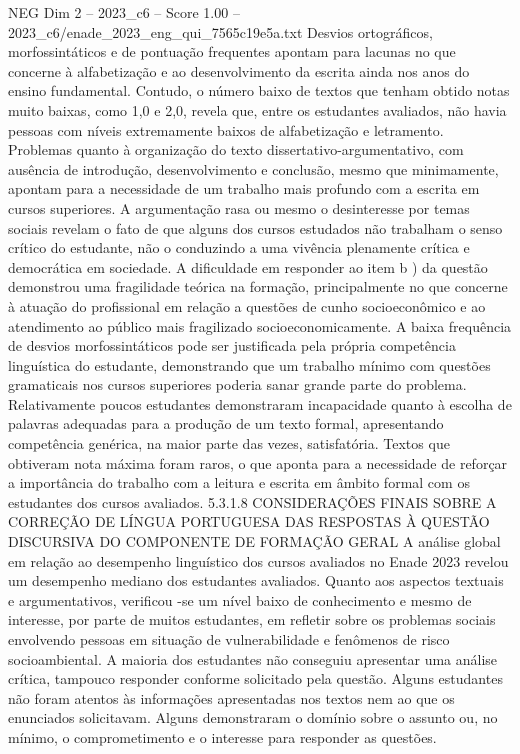\begin{textsample}{NEG Dim 2 – 2023\_c6 – Score 1.00 – 2023\_c6/enade\_2023\_eng\_qui\_7565c19e5a.txt}
Desvios ortográficos, morfossintáticos e de pontuação frequentes apontam para lacunas no que concerne à alfabetização e ao desenvolvimento da escrita ainda nos anos do ensino fundamental.
Contudo, o número baixo de textos que tenham obtido notas muito baixas, como 1,0 e 2,0, revela que, entre os estudantes avaliados, não havia pessoas com níveis extremamente baixos de alfabetização e letramento.
Problemas quanto à organização do texto dissertativo-argumentativo, com ausência de introdução, desenvolvimento e conclusão, mesmo que minimamente, apontam para a necessidade de um trabalho mais profundo com a escrita em cursos superiores.
A argumentação rasa ou mesmo o desinteresse por temas sociais revelam o fato de que alguns dos cursos estudados não trabalham o senso crítico do estudante, não o conduzindo a uma vivência plenamente crítica e democrática em sociedade.
A dificuldade em responder ao item b ) da questão demonstrou uma fragilidade teórica na formação, principalmente no que concerne à atuação do profissional em relação a questões de cunho socioeconômico e ao atendimento ao público mais fragilizado socioeconomicamente.
A baixa frequência de desvios morfossintáticos pode ser justificada pela própria competência linguística do estudante, demonstrando que um trabalho mínimo com questões gramaticais nos cursos superiores poderia sanar grande parte do problema.
Relativamente poucos estudantes demonstraram incapacidade quanto à escolha de palavras adequadas para a produção de um texto formal, apresentando competência genérica, na maior parte das vezes, satisfatória.
Textos que obtiveram nota máxima foram raros, o que aponta para a necessidade de reforçar a importância do trabalho com a leitura e escrita em âmbito formal com os estudantes dos cursos avaliados. 5.3.1.8 CONSIDERAÇÕES FINAIS SOBRE A CORREÇÃO DE LÍNGUA PORTUGUESA DAS RESPOSTAS À QUESTÃO DISCURSIVA DO COMPONENTE DE FORMAÇÃO GERAL A análise global em relação ao desempenho linguístico dos cursos avaliados no Enade 2023 revelou um desempenho mediano dos estudantes avaliados.
Quanto aos aspectos textuais e argumentativos, verificou -se um nível baixo de conhecimento e mesmo de interesse, por parte de muitos estudantes, em refletir sobre os problemas sociais envolvendo pessoas em situação de vulnerabilidade e fenômenos de risco socioambiental.
A maioria dos estudantes não conseguiu apresentar uma análise crítica, tampouco responder conforme solicitado pela questão.
Alguns estudantes não foram atentos às informações apresentadas nos textos nem ao que os enunciados solicitavam.
Alguns demonstraram o domínio sobre o assunto ou, no mínimo, o comprometimento e o interesse para responder as questões.

\end{textsample}
